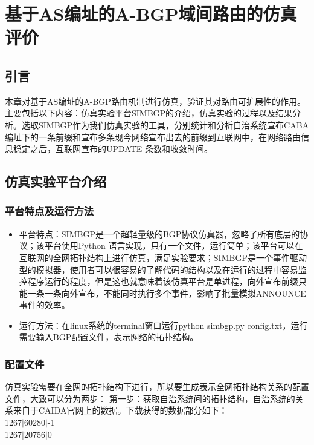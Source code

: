 

\chapter{基于AS编址的A-BGP域间路由的仿真评价}
\label{cha:simu}
\section{引言}
本章对基于AS编址的A-BGP路由机制进行仿真，验证其对路由可扩展性的作用。主要包括以下内容：仿真实验平台SIMBGP的介绍，仿真实验的过程以及结果分析。选取SIMBGP作为我们仿真实验的工具，分别统计和分析自治系统宣布CABA编址下的一条前缀和宣布多条现今网络宣布出去的前缀到互联网中，在网络路由信息稳定之后，互联网宣布的UPDATE 条数和收敛时间。

\section{仿真实验平台介绍}
\subsection{平台特点及运行方法}
\begin{itemize}
\item 平台特点：SIMBGP是一个超轻量级的BGP协议仿真器，忽略了所有底层的协议；该平台使用Python 语言实现，只有一个文件，运行简单；该平台可以在互联网的全网拓扑结构上进行仿真，满足实验要求；SIMBGP是一个事件驱动型的模拟器，使用者可以很容易的了解代码的结构以及在运行的过程中容易监控程序运行的程度，但是这也就意味着该仿真平台是单进程，向外宣布前缀只能一条一条向外宣布，不能同时执行多个事件，影响了批量模拟ANNOUNCE事件的效率。
\item 运行方法：在linux系统的terminal窗口运行python simbgp.py  config.txt，运行需要输入BGP配置文件，表示网络的拓扑结构。
\end{itemize}

\subsection{配置文件}
\label{subsect:config}
仿真实验需要在全网的拓扑结构下进行，所以要生成表示全网拓扑结构关系的配置文件，大致可以分为两步：
第一步：获取自治系统间的拓扑结构，自治系统的关系来自于CAIDA官网上的数据。下载获得的数据部分如下：\\
1267$|$60280$|$-1\\
1267$|$20756$|$0


